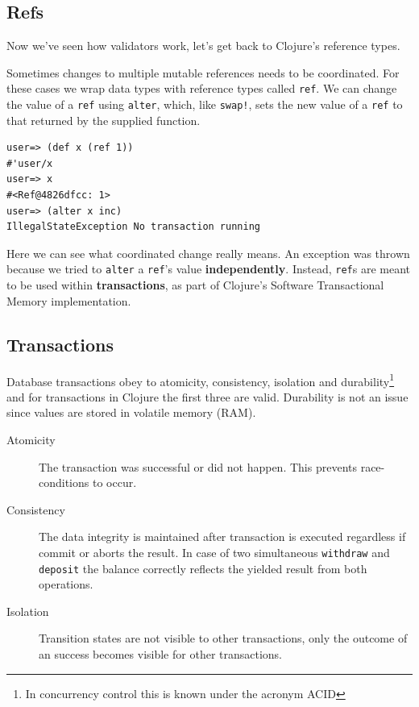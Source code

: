 \documentclass[a4paper,12pt]{kth-mag}
\begin{document}
\subsection{Refs}

Now we've seen how validators work, let's get back to Clojure's reference types.

Sometimes changes to multiple mutable references needs to be coordinated. For these cases we wrap data types with reference types called \texttt{ref}. We can change the value of a \texttt{ref} using \texttt{alter}, which, like \texttt{swap!}, sets the new value of a \texttt{ref} to that returned by the supplied function. 

\begin{listing}[H]
	\begin{verbatim}
user=> (def x (ref 1))
#'user/x
user=> x
#<Ref@4826dfcc: 1>
user=> (alter x inc)
IllegalStateException No transaction running
	\end{verbatim}
\end{listing}

Here we can see what coordinated change really means. An exception was thrown because we tried to \texttt{alter} a \texttt{ref}'s value \textbf{independently}. Instead, \texttt{ref}s are meant to be used within \textbf{transactions}, as part of Clojure's Software Transactional Memory implementation. 

\subsection{Transactions}
Database transactions obey to atomicity, consistency, isolation and durability\footnote{In concurrency control this is known under the acronym ACID} and for transactions in Clojure the first three are valid. Durability is not an issue since values are stored in volatile memory (RAM).

\begin{description}
    \item[Atomicity] The transaction was successful or did not happen. This prevents race-conditions to occur.
    \item[Consistency] The data integrity is maintained after transaction is executed regardless if commit or aborts the result. In case of two simultaneous \texttt{withdraw} and \texttt{deposit} the balance correctly reflects the yielded result from both operations.
    \item[Isolation] Transition states are not visible to other transactions, only the outcome of an success becomes visible for other transactions.
\end{description}
\end{document}
